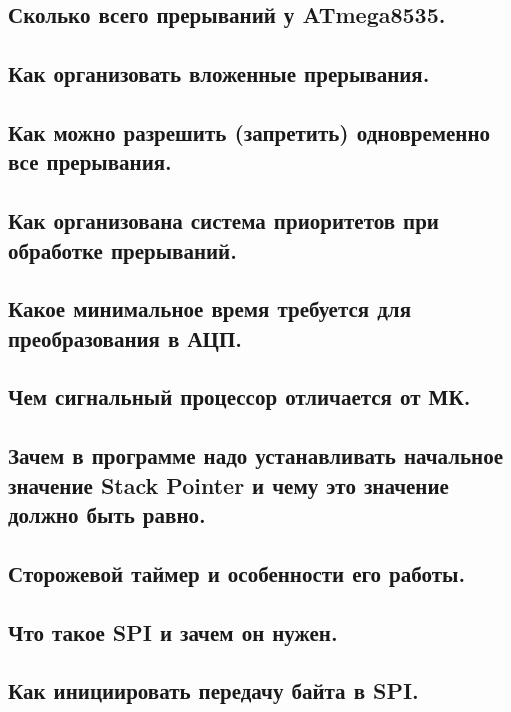 \subsection{Сколько всего прерываний у ATmega8535.}


\subsection{Как организовать вложенные прерывания.}


\subsection{Как можно разрешить (запретить) одновременно все прерывания.}


\subsection{Как организована система приоритетов при обработке прерываний. }


\subsection{Какое минимальное время требуется для преобразования в АЦП.}


\subsection{Чем сигнальный процессор отличается от МК.}


\subsection{Зачем в программе надо устанавливать начальное значение Stack Pointer и чему это значение должно быть равно.}


\subsection{Сторожевой таймер и особенности его работы.}


\subsection{Что такое SPI и зачем он нужен.}


\subsection{Как инициировать передачу байта в SPI.}


